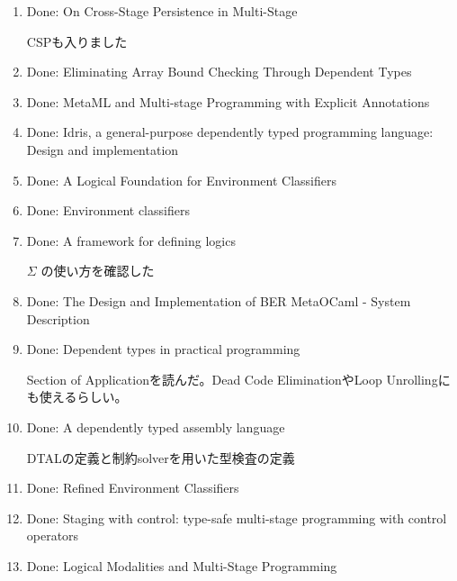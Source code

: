 \documentclass[runningheads]{llncs}
\newcommand{\red}[1]{\textcolor{red}{#1 }}
\begin{document}
  \begin{enumerate}
      \item Done: On Cross-Stage Persistence in Multi-Stage\cite{Hanada2014}

          CSPも入りました
      \item Done: Eliminating Array Bound Checking Through Dependent Types\cite{Xi98}
      \item Done: MetaML and Multi-stage Programming with Explicit Annotations\cite{MetaML}
      \item Done: Idris, a general-purpose dependently typed programming language: Design and implementation\cite{brady2013idris}
      \item Done: A Logical Foundation for Environment Classifiers\cite{Tsukada}
      \item Done: Environment classifiers\cite{taha2003environment}
      \item Done: A framework for defining logics\cite{harper1993framework}

          $\Sigma$ の使い方を確認した
      \item Done: The Design and Implementation of {BER} MetaOCaml - System Description\cite{oleg2014}
      \item Done: Dependent types in practical programming\cite{xi1999dependent}

          Section of Applicationを読んだ。Dead Code EliminationやLoop Unrollingにも使えるらしい。

      \item Done: A dependently typed assembly language\cite{xi2001dependently}

          DTALの定義と制約solverを用いた型検査の定義
      \item Done: Refined Environment Classifiers\cite{kiselyov2016refined}
      \item Done: Staging with control: type-safe multi-stage programming with control operators\cite{oishi2017staging}
      \item Done: Logical Modalities and Multi-Stage Programming\cite{benaissa1999logical}
  \end{enumerate}
\end{document}
